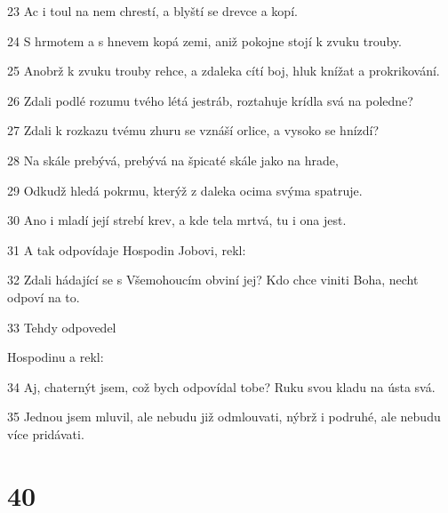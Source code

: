 \par 23 Ac i toul na nem chrestí, a blyští se drevce a kopí.
\par 24 S hrmotem a s hnevem kopá zemi, aniž pokojne stojí k zvuku trouby.
\par 25 Anobrž k zvuku trouby rehce, a zdaleka cítí boj, hluk knížat a prokrikování.
\par 26 Zdali podlé rozumu tvého létá jestráb, roztahuje krídla svá na poledne?
\par 27 Zdali k rozkazu tvému zhuru se vznáší orlice, a vysoko se hnízdí?
\par 28 Na skále prebývá, prebývá na špicaté skále jako na hrade,
\par 29 Odkudž hledá pokrmu, kterýž z daleka ocima svýma spatruje.
\par 30 Ano i mladí její strebí krev, a kde tela mrtvá, tu i ona jest.
\par 31 A tak odpovídaje Hospodin Jobovi, rekl:
\par 32 Zdali hádající se s Všemohoucím obviní jej? Kdo chce viniti Boha, necht odpoví na to.
\par 33 Tehdy odpovedel \par Hospodinu a rekl:
\par 34 Aj, chaternýt jsem, což bych odpovídal tobe? Ruku svou kladu na ústa svá.
\par 35 Jednou jsem mluvil, ale nebudu již odmlouvati, nýbrž i podruhé, ale nebudu více pridávati.

\chapter{40}

